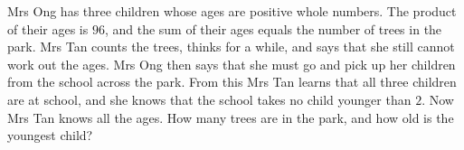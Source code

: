 Mrs Ong has three children whose ages are positive whole numbers. The product of their ages is $96$, and the sum of their ages equals the number of trees in the park. Mrs Tan counts the trees, thinks for a while, and says that she still cannot work out the ages. Mrs Ong then says that she must go and pick up her children from the school across the park. From this Mrs Tan learns that all three children are at school, and she knows that the school takes no child younger than $2$. Now Mrs Tan knows all the ages. How many trees are in the park, and how old is the youngest child?
